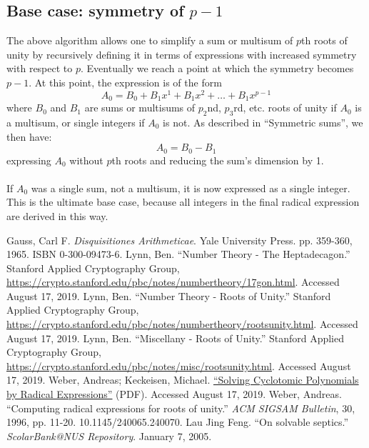 \documentclass{article}
\begin{document}
\subsection{Base case: symmetry of $ p - 1 $}
    The above algorithm allows one to simplify a sum or multisum of $ p $th roots of unity by recursively defining it in terms of expressions with increased symmetry with respect to $ p $. Eventually we reach a point at which the symmetry becomes $ p - 1 $. At this point, the expression is of the form
    $$ A_0 = B_0 + B_1 x^1 + B_1 x^2 + \dots + B_1 x^{p - 1} $$
    where $ B_0 $ and $ B_1 $ are sums or multisums of $ p_2 $nd, $ p_3 $rd, etc. roots of unity if $ A_0 $ is a multisum, or single integers if $ A_0 $ is not. As described in ``Symmetric sums'', we then have:
    $$ A_0 = B_0 - B_1 $$
    expressing $ A_0 $ without $ p $th roots and reducing the sum's dimension by 1.\\
    \\
    If $ A_0 $ was a single sum, not a multisum, it is now expressed as a single integer. This is the ultimate base case, because all integers in the final radical expression are derived in this way.\\
\begin{thebibliography}{7}
        Gauss, Carl F. \textit{Disquisitiones Arithmeticae}. Yale University Press. pp. 359-360, 1965. ISBN 0-300-09473-6.
        Lynn, Ben. ``Number Theory - The Heptadecagon.'' Stanford Applied Cryptography Group, \url{https://crypto.stanford.edu/pbc/notes/numbertheory/17gon.html}. Accessed August 17, 2019.
        Lynn, Ben. ``Number Theory - Roots of Unity.'' Stanford Applied Cryptography Group, \url{https://crypto.stanford.edu/pbc/notes/numbertheory/rootsunity.html}. Accessed August 17, 2019.
        Lynn, Ben. ``Miscellany - Roots of Unity.'' Stanford Applied Cryptography Group, \url{https://crypto.stanford.edu/pbc/notes/misc/rootsunity.html}. Accessed August 17, 2019.
        Weber, Andreas; Keckeisen, Michael. \href{http://cg.cs.uni-bonn.de/personal-pages/weber/publications/pdf/WeberA/WeberKeckeisen99a.pdf}{``Solving Cyclotomic Polynomials by Radical Expressions''} (PDF). Accessed August 17, 2019.
        Weber, Andreas. ``Computing radical expressions for roots of unity.'' \textit{ACM SIGSAM Bulletin}, 30, 1996, pp. 11-20. 10.1145/240065.240070.
        Lau Jing Feng. ``On solvable septics.'' \textit{ScolarBank@NUS Repository}. January 7, 2005.
\end{thebibliography}
\end{document}

